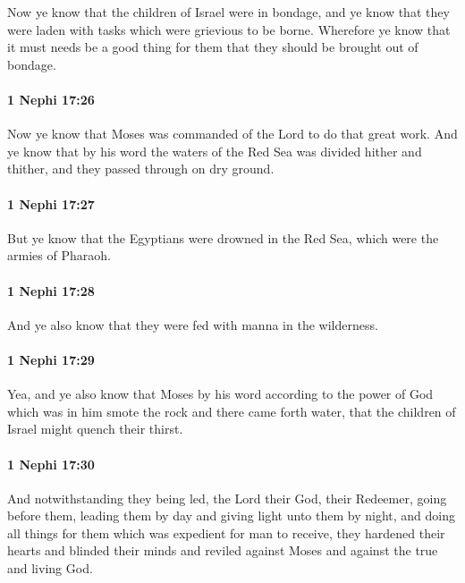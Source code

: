 			Now ye know that the children of Israel were in bondage,
			and ye know that they were laden with tasks
			which were grievious to be borne.
			Wherefore ye know that it must needs be a good thing for them
			that they should be brought out of bondage.

		\paragraph{1 Nephi 17:26} %
			\label{1NEPHI-17-26}

			Now ye know that Moses was commanded of the Lord to do that great work.
			And ye know that by his word
			the waters of the Red Sea was divided hither and thither,
			and they passed through on dry ground.

		\paragraph{1 Nephi 17:27} %
			\label{1NEPHI-17-27}

			But ye know that the Egyptians were drowned in the Red Sea,
			which were the armies of Pharaoh.

		\paragraph{1 Nephi 17:28} %
			\label{1NEPHI-17-28}

			And ye also know that they were fed with manna in the wilderness.

		\paragraph{1 Nephi 17:29} %
			\label{1NEPHI-17-29}

			Yea, and ye also know that Moses by his word
			according to the power of God which was in him
			smote the rock and there came forth water,
			that the children of Israel might quench their thirst.

		\paragraph{1 Nephi 17:30} %
			\label{1NEPHI-17-30}

			And notwithstanding they being led,
			the Lord their God, their Redeemer, going before them,
			leading them by day and giving light unto them by night,
			and doing all things for them which was expedient for man to receive,
			they hardened their hearts and blinded their minds
			and reviled against Moses and against the true and living God.

